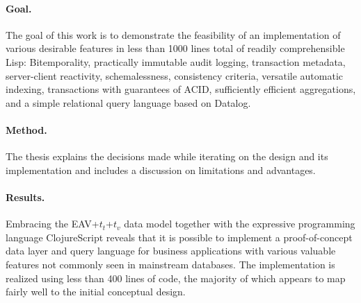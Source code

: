 \paragraph{Goal.}
The goal of this work is to demonstrate the feasibility of an implementation of various desirable features in less than 1000 lines total of readily comprehensible Lisp: Bitemporality, practically immutable audit logging, transaction metadata, server-client reactivity, schemalessness, consistency criteria, versatile automatic indexing, transactions with guarantees of \gls{ACID}, sufficiently efficient aggregations, and a simple relational query language based on Datalog.

\paragraph{Method.}
The thesis explains the decisions made while iterating on the design and its implementation and includes a discussion on limitations and advantages.

\paragraph{Results.}
Embracing the EAV+$t_t$+$t_v$ data model together with the expressive programming language ClojureScript \cite{hickey2008clojure} reveals that it is possible to implement a proof-of-concept data layer and query language for business applications with various valuable features not commonly seen in mainstream databases. The implementation is realized using less than 400 lines of code, the majority of which appears to map fairly well to the initial conceptual design.
